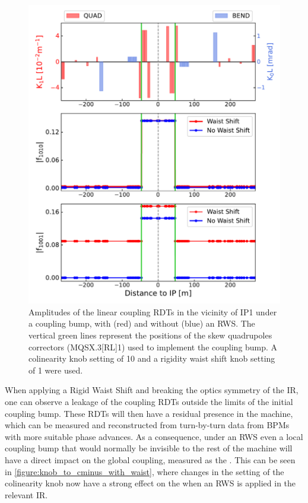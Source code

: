\begin{figure}[!htb]
    \centering
    \includegraphics*[width=\textwidth]{Figures/IR_Coupling_Correction/waist_shift_leaks_rdts.pdf}
    \caption{Amplitudes of the linear coupling RDTs in the vicinity of IP\num{1} under a coupling bump, with (\textcolor{mplr}{red}) and without (\textcolor{mplb}{blue}) an RWS. The vertical \textcolor{mqsx_green}{green} lines represent the positions of the skew quadrupoles correctors (MQSX.\num{3}[RL]\num{1}) used to implement the coupling bump. A colinearity knob setting of \num{10} and a rigidity waist shift knob setting of \num{1} were used.}
    \label{figure:rdt_leak}
\end{figure}
\break

When applying a Rigid Waist Shift and breaking the optics symmetry of the IR, one can observe a leakage of the coupling \glspl{RDT} outside the limits of the initial coupling bump.
These RDTs will then have a residual presence in the machine, which can be measured and reconstructed from turn-by-turn data from \glspl{BPM} with more suitable phase advances.
As a consequence, under an RWS even a local coupling bump that would normally be invisible to the rest of the machine will have a direct impact on the global coupling, measured as the .
This can be seen in \cref{figure:knob_to_cminus_with_waist}, where changes in the setting of the colinearity knob now have a strong effect on the  when an RWS is applied in the relevant \gls{IR}.

